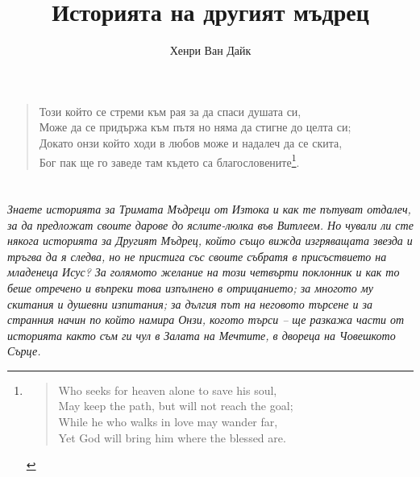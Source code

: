 \documentclass[oneside,10pt]{memoir}
\title{Историята на другият мъдрец}
\author{Хенри Ван Дайк}
\begin{document}
\thispagestyle{empty}


\newpage

\begin{KeepFromToc}
  \tableofcontents
\end{KeepFromToc}

\chapter*{}

\begin{quote}
  \fontsize{8}{10}\selectfont
  Този който се стреми към рая за да спаси душата си, \\
  Може да се придържа към пътя но няма да стигне до целта си; \\
  Докато онзи който ходи в любов може и надалеч да се скита, \\
  Бог пак ще го заведе там където са благословените\footnote{
  \begin{quote}
    Who seeks for heaven alone to save his soul, \\
    May keep the path, but will not reach the goal; \\
    While he who walks in love may wander far, \\
    Yet God will bring him where the blessed are.
  \end{quote}
  }.
\end{quote}

\newpage

\chapter*{}
\emph{
\fontsize{9}{10}\selectfont
Знаете историята за Тримата Мъдреци от Изтока и как те пътуват отдалеч, за да
предложат своите дарове до яслите-люлка във Витлеем. Но чували ли сте някога
историята за Другият Мъдрец, който също вижда изгряващата звезда и тръгва да я
следва, но не пристига със своите събратя в присъствието на младенеца Исус? За
голямото желание на този четвърти поклонник и как то беше отречено и въпреки
това изпълнено в отрицанието; за многото му скитания и душевни изпитания; за
дългия път на неговото търсене и за странния начин по който намира Онзи, когото
търси -- ще разкажа части от историята както съм ги чул в Залата на Мечтите, в
двореца на Човешкото Сърце.
}
\end{document}
